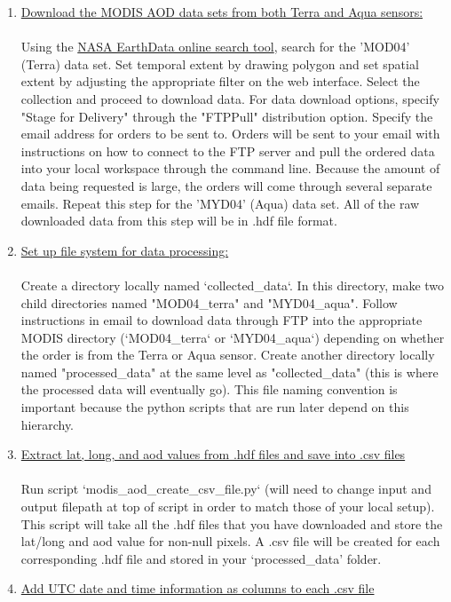 \begin{enumerate}
\item \underline{Download the MODIS AOD data sets from both Terra and Aqua sensors:}\\\\
Using the \href{https://search.earthdata.nasa.gov/search?q=MOD04&ok=MOD04}{NASA EarthData online search tool}, search for the 'MOD04' (Terra) data set. Set temporal extent by drawing polygon and set spatial extent by adjusting the appropriate filter on the web interface. Select the collection and proceed to download data. For data download options, specify "Stage for Delivery" through the "FTPPull" distribution option. Specify the email address for orders to be sent to. Orders will be sent to your email with instructions on how to connect to the FTP server and pull the ordered data into your local workspace through the command line. Because the amount of data being requested is large, the orders will come through several separate emails. Repeat this step for the 'MYD04' (Aqua) data set. All of the raw downloaded data from this step will be in .hdf file format.
\item  \underline{Set up file system for data processing:}\\\\ 
Create a directory locally named `collected\_data`. In this directory, make two child directories named "MOD04\_terra" and "MYD04\_aqua". Follow instructions in email to download data through FTP into the appropriate MODIS directory (`MOD04\_terra` or `MYD04\_aqua`) depending on whether the order is from the Terra or Aqua sensor. Create another directory locally named "processed\_data" at the same level as "collected\_data" (this is where the processed data will eventually go). This file naming convention is important because the python scripts that are run later depend on this hierarchy.
\item \underline{Extract lat, long, and aod values from .hdf files and save into .csv files}\\\\
Run script `modis\_aod\_create\_csv\_file.py` (will need to change input and output filepath at top of script in order to match those of your local setup). This script will take all the .hdf files that you have downloaded and store the lat/long and aod value for non-null pixels. A .csv file will be created for each corresponding .hdf file and stored in your `processed\_data' folder.
\item \underline{Add UTC date and time information as columns to each .csv file}\\\\

\end{enumerate}
